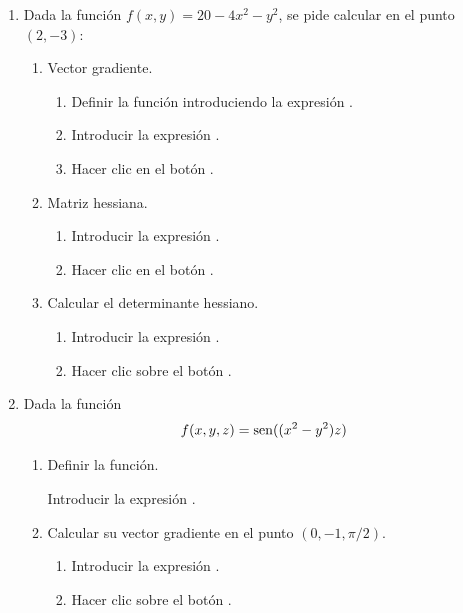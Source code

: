\begin{enumerate}[leftmargin=*]
\item Dada la función $f(x,y)=20-4x^2-y^2$, se pide calcular en el punto $(2,-3)$:
\begin{enumerate}
\item Vector gradiente.
\begin{indicacion}{
\begin{enumerate}
\item Definir la función introduciendo la expresión .
\item Introducir la expresión .
\item Hacer clic en el botón .
\end{enumerate}
}
\end{indicacion}

\item Matriz hessiana.
\begin{indicacion}{
\begin{enumerate}
\item Introducir la expresión .
\item Hacer clic en el botón .
\end{enumerate}
}
\end{indicacion}

\item Calcular el determinante hessiano.
\begin{indicacion}{
\begin{enumerate}
\item Introducir la expresión .
\item Hacer clic sobre el botón .
\end{enumerate}
}
\end{indicacion}
\end{enumerate} 


\item Dada la función
\[
f(x,y,z)=\mathop{\rm sen}\nolimits((x^2-y^2)z)
\]
\begin{enumerate}
\item Definir la función.
\begin{indicacion}
{Introducir la expresión .
}
\end{indicacion}

\item Calcular su vector gradiente en el punto $(0,-1,\pi/2)$.
\begin{indicacion}{
\begin{enumerate}
\item Introducir la expresión .
\item Hacer clic sobre el botón .
\end{enumerate}
}
\end{indicacion}


\end{enumerate}
\end{enumerate}
